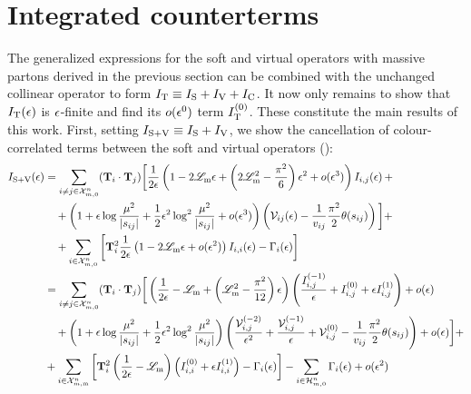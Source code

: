 
\section{Integrated counterterms}
\label{sec:int-count}

The generalized expressions for the soft and virtual operators with massive partons derived in the previous section can be combined with the unchanged collinear operator to form $ I_\text{T} \equiv I_\text{S} + I_\text{V} + I_\text{C} $. It now only remains to show that $ I_\text{T}(\epsilon) $ is $ \epsilon $-finite and find its $ o(\epsilon^0) $ term $ I_\text{T}^{(0)} $. These constitute the main results of this work. First, setting $ I_{\text{S}+\text{V}} \equiv I_\text{S} + I_\text{V} $, we show the cancellation of colour-correlated terms between the soft and virtual operators ():
\begin{equation*}
  \begin{split}
    I_{\text{S}+\text{V}}(\epsilon)
    & = \sum_{i \neq j \in \mathcal{X}^{n}_{m,0}} (\mathbf{T}_i \cdot \mathbf{T}_j) \bigg[ \frac{1}{2\epsilon} \left( 1 - 2\mathscr{L}_\text{m} \epsilon + \left( 2\mathscr{L}_\text{m}^2 - \frac{\pi^2}{6} \right) \epsilon^2 + o(\epsilon^3) \right) I_{i,j}(\epsilon) \,+ \\
    & \quad + \left( 1 + \epsilon \log \frac{\mu^2}{\left\lvert s_{ij}\right\rvert} + \frac{1}{2} \epsilon^2 \log^2 \frac{\mu^2}{\left\lvert s_{ij}\right\rvert} + o(\epsilon^3) \right) \left( \mathcal{V}_{ij}(\epsilon) - \frac{1}{v_{ij}} \frac{\pi^2}{2} \theta(s_{ij}) \right) \bigg] + \\
    & \quad + \sum_{i \in \mathcal{X}^{n}_{m,0}} \bigg[ \mathbf{T}_i^2 \frac{1}{2\epsilon} \left( 1 - 2\mathscr{L}_\text{m} \epsilon + o(\epsilon^2) \right) I_{i,i}(\epsilon) - \Gamma_i(\epsilon) \bigg] \\
    & = \sum_{i \neq j \in \mathcal{X}^{n}_{m,0}} (\mathbf{T}_i \cdot \mathbf{T}_j) \bigg[ \left( \frac{1}{2\epsilon} - \mathscr{L}_\text{m} + \left( \mathscr{L}_\text{m}^2 - \frac{\pi^2}{12} \right) \epsilon \right) \left( \frac{I_{i,j}^{(-1)}}{\epsilon} + I_{i,j}^{(0)} + \epsilon I_{i,j}^{(1)} \right) + o(\epsilon) \\
    & \quad + \left( 1 + \epsilon \log \frac{\mu^2}{\left\lvert s_{ij}\right\rvert} + \frac{1}{2} \epsilon^2 \log^2 \frac{\mu^2}{\left\lvert s_{ij}\right\rvert} \right) \left( \frac{\mathcal{V}_{i,j}^{(-2)}}{\epsilon^2} + \frac{\mathcal{V}_{i,j}^{(-1)}}{\epsilon} + \mathcal{V}_{i,j}^{(0)} - \frac{1}{v_{ij}} \frac{\pi^2}{2} \theta(s_{ij}) \right) + o(\epsilon) \bigg] + \\
    & + \sum_{i \in \mathcal{X}^{n}_{m,\text{m}}} \left[ \mathbf{T}_i^2 \left( \frac{1}{2\epsilon} - \mathscr{L}_\text{m} \right) \left( I_{i,i}^{(0)} + \epsilon I_{i,i}^{(1)} \right) - \Gamma_i(\epsilon) \right] - \sum_{i \in \mathcal{H}^{n}_{m,0}} \Gamma_i(\epsilon) + o(\epsilon^2)
  \end{split}
\end{equation*}
